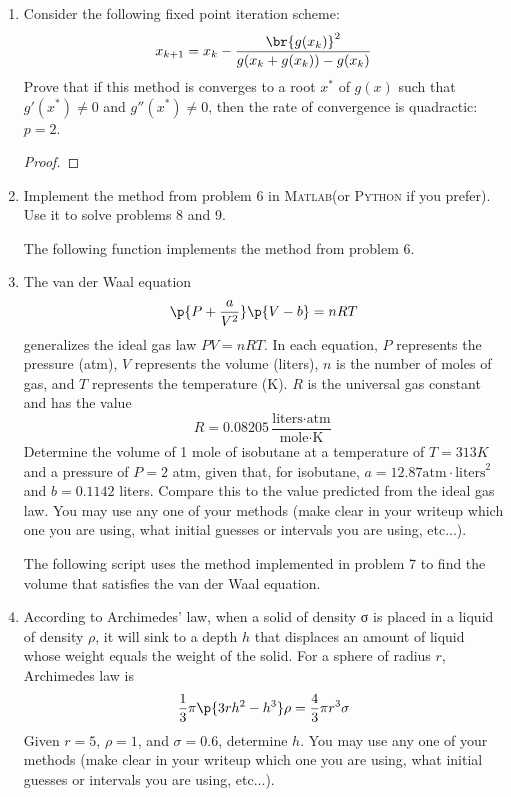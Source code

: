 \documentclass[11pt, oneside]{article}
\newcommand{\MATLAB}{\textsc{Matlab}\xspace}
\newcommand{\PYTHON}{\textsc{Python}\xspace}
\begin{document}
\begin{enumerate}
  \item %
    Consider the following fixed point iteration scheme:
    \[
      x_{k+1} = x_k - \frac{\br{g(x_k)}^2}{g(x_k + g(x_k)) - g(x_k)}
    \]
    Prove that if this method is converges to a root $x^*$ of $g(x)$ such that
    $g'(x^*)\neq 0$ and $g''(x^*) \neq 0$, then the rate of convergence is
    quadractic: $p = 2$.

    \begin{proof}
      
    \end{proof}

  \item %
    Implement the method from problem 6 in \MATLAB (or \PYTHON if you prefer).
    Use it to solve problems 8 and 9.

    The following function implements the method from problem 6.
    

  \item %
    The van der Waal equation
    \[
      \p{P + \frac{a}{V^2}}\p{V - b} = nRT
    \]
    generalizes the ideal gas law $PV = nRT$.
    In each equation, $P$ represents the pressure (atm), $V$ represents the volume
    (liters), $n$ is the number of moles of gas, and $T$ represents the temperature
    (K).
    $R$ is the universal gas constant and has the value
    \[
      R = 0.08205 \frac{\text{liters} \cdot \text{atm}}{\text{mole}\cdot \text{K}}
    \]
    Determine the volume of 1 mole of isobutane at a temperature of $T = 313 K$ and
    a pressure of $P = 2$ atm, given that, for isobutane,
    $a = 12.87 \text{atm} \cdot \text{liters}^2$ and $b = 0.1142$ liters.
    Compare this to the value predicted from the ideal gas law.
    You may use any one of your methods (make clear in your writeup which one
    you are using, what initial guesses or intervals you are using, etc...).

    The following script uses the method implemented in problem 7 to find the
    volume that satisfies the van der Waal equation.
    

  \item %
    According to Archimedes’ law, when a solid of density σ is placed in a
    liquid of density $\rho$, it will sink to a depth $h$ that displaces an
    amount of liquid whose weight equals the weight of the solid.
    For a sphere of radius $r$, Archimedes law is
    \[
      \frac{1}{3} \pi \p{3rh^2 - h^3}\rho = \frac{4}{3}\pi r^3 \sigma
    \]
    Given $r = 5$, $\rho = 1$, and $\sigma = 0.6$, determine $h$.
    You may use any one of your methods (make clear in your writeup which one
    you are using, what initial guesses or intervals you are using, etc...).
    

\end{enumerate}
\end{document}
